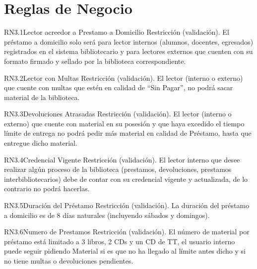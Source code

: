 
\section{Reglas de Negocio}

\begin{BussinesRule}{RN3.1}{Lector acreedor a Prestamo a Domicilio} 
	\BRitem[Tipo:] Restricción (validación).
	\BRitem[Descripción:]El préstamo a domicilio solo será para lector internos (alumnos, docentes, egresados) registrados en el sistema bibliotecario y para lectores externos que cuenten con su formato firmado y sellado por la biblioteca correspondiente.
\end{BussinesRule}

\begin{BussinesRule}{RN3.2}{Lector con Multas} 
	\BRitem[Tipo:] Restricción (validación).
	\BRitem[Descripción:]El lector (interno o externo) que cuente con multas que estén en calidad de “Sin Pagar”, no podrá sacar material de la biblioteca.
\end{BussinesRule}

\begin{BussinesRule}{RN3.3}{Devoluciones Atrasadas} 
	\BRitem[Tipo:] Restricción (validación).
	\BRitem[Descripción:]El lector (interno o externo) que cuente con material en su posesión y que haya excedido el tiempo límite de entrega no podrá pedir más material en calidad de Préstamo, hasta que entregue dicho material.
\end{BussinesRule}

\begin{BussinesRule}{RN3.4}{Credencial Vigente} 
	\BRitem[Tipo:] Restricción (validación).
	\BRitem[Descripción:]El lector interno que desee realizar algún proceso de la biblioteca (prestamos, devoluciones, prestamos interbibliotecarios) debe de contar con su credencial vigente y actualizada, de lo contrario no podrá hacerlas.
\end{BussinesRule}

\begin{BussinesRule}{RN3.5}{Duración del Préstamo} 
	\BRitem[Tipo:] Restricción (validación).
	\BRitem[Descripción:]La duración del préstamo a domicilio es de 8 días naturales (incluyendo sábados y domingos).
\end{BussinesRule}

\begin{BussinesRule}{RN3.6}{Numero de Prestamos} 
	\BRitem[Tipo:] Restricción (validación).
	\BRitem[Descripción:]El número de material por préstamo está limitado a 3 libros, 2 CDs y un CD de TT, el usuario interno puede seguir pidiendo Material si es que no ha llegado al límite antes dicho y si no tiene multas o devoluciones pendientes.
\end{BussinesRule}

